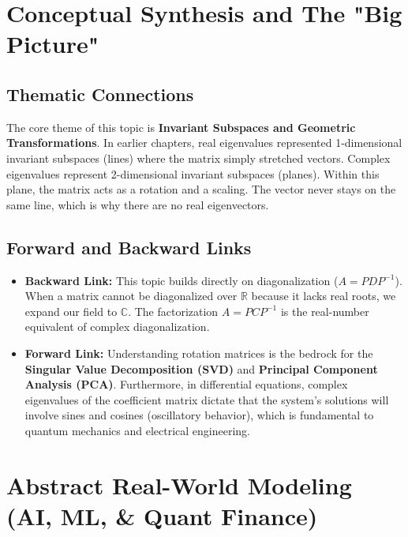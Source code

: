\documentclass[11pt, letterpaper]{article}
\theoremstyle{definition}
\theoremstyle{remark}
\newcommand{\R}{\mathbb{R}}
\begin{document}
\newpage

\section{Conceptual Synthesis and The "Big Picture"}

\subsection{Thematic Connections}
The core theme of this topic is \textbf{Invariant Subspaces and Geometric Transformations}. In earlier chapters, real eigenvalues represented 1-dimensional invariant subspaces (lines) where the matrix simply stretched vectors. Complex eigenvalues represent 2-dimensional invariant subspaces (planes). Within this plane, the matrix acts as a rotation and a scaling. The vector never stays on the same line, which is why there are no real eigenvectors.

\subsection{Forward and Backward Links}
\begin{itemize}
    \item \textbf{Backward Link:} This topic builds directly on diagonalization ($A = PDP^{-1}$). When a matrix cannot be diagonalized over $\R$ because it lacks real roots, we expand our field to $\mathbb{C}$. The factorization $A = PCP^{-1}$ is the real-number equivalent of complex diagonalization.
    \item \textbf{Forward Link:} Understanding rotation matrices is the bedrock for the \textbf{Singular Value Decomposition (SVD)} and \textbf{Principal Component Analysis (PCA)}. Furthermore, in differential equations, complex eigenvalues of the coefficient matrix dictate that the system's solutions will involve sines and cosines (oscillatory behavior), which is fundamental to quantum mechanics and electrical engineering.
\end{itemize}

\section{Abstract Real-World Modeling (AI, ML, \& Quant Finance)}
\end{document}
